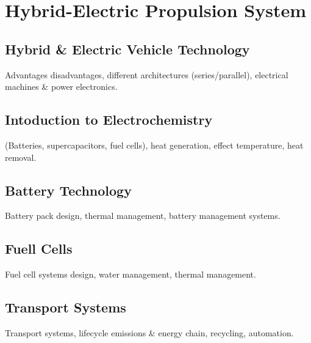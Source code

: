 \chapter{Hybrid-Electric Propulsion System}
\section{Hybrid \& Electric Vehicle Technology}
Advantages disadvantages, different architectures (series/parallel), electrical
machines \& power electronics.
\section{Intoduction to Electrochemistry}
(Batteries, supercapacitors, fuel cells), heat generation, effect temperature, heat removal.
\section{Battery Technology}
Battery pack design, thermal management, battery management systems.
\section{Fuell Cells}
Fuel cell systems design, water management, thermal management.
\section{Transport Systems}
Transport systems, lifecycle emissions \& energy chain, recycling, automation.
